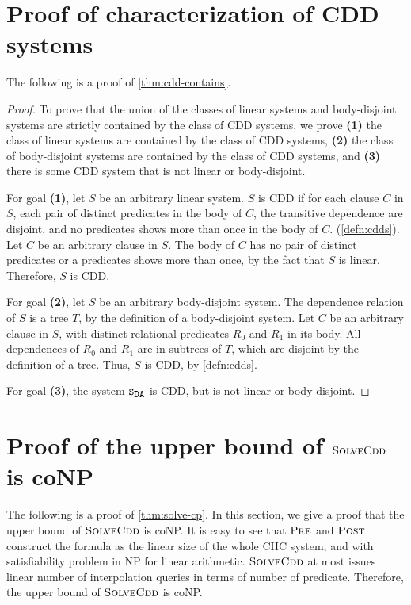 \section{Proof of characterization of CDD systems}
\label{app:char}
The following is a proof of \autoref{thm:cdd-contains}.
%
\begin{proof}
  To prove that the union of the classes of linear systems and
  body-disjoint systems are strictly contained by the class of CDD
  systems, we prove %
  \textbf{(1)} the class of linear systems are contained by the class
  of CDD systems, %
  \textbf{(2)} the class of body-disjoint systems are contained by the
  class of CDD systems, and %
  \textbf{(3)} there is some CDD system that is not linear or
  body-disjoint.

  For goal \textbf{(1)}, let $S$ be an arbitrary linear
  system.
  $S$ is CDD if for each clause $C$ in
  $S$, each pair of distinct predicates in
  the body of $C$, the transitive dependence are disjoint, and
  no predicates shows more than once in the body of $C$.
  (\autoref{defn:cdds}).
  Let $C$ be an arbitrary clause in $S$.
  The body of $C$ has no pair of distinct predicates or a predicates shows more than once, by the fact that
  $S$ is linear.
  Therefore, $S$ is CDD.

  For goal \textbf{(2)}, let $S$ be an arbitrary
  body-disjoint system.
  The dependence relation of $S$ is a tree $T$, by the
  definition of a body-disjoint system.
  Let $C$ be an arbitrary clause in $S$, with
  distinct relational predicates $R_0$ and $R_1$ in its body.
  All dependences of $R_0$ and $R_1$ are in subtrees of $T$, which
  are disjoint by the definition of a tree.
  Thus, $S$ is CDD, by \autoref{defn:cdds}.

  For goal \textbf{(3)}, the system $\mcchc$ is CDD, but is not linear
  or body-disjoint.
\end{proof}

\section{Proof of the upper bound of $\textsc{SolveCdd}$ is coNP}
\label{app:solve-cp}
The following is a proof of \autoref{thm:solve-cp}.
%
In this section, we give a proof that the upper bound of $\textsc{SolveCdd}$ is coNP.
%
It is easy to see that $\textsc{Pre}$ and $\textsc{Post}$ construct the formula as the linear size
of the whole CHC system, and with satisfiability problem in NP for linear arithmetic.
%
$\textsc{SolveCdd}$ at most issues linear number of interpolation queries in terms of number of predicate.
%
Therefore, the upper bound of $\textsc{SolveCdd}$ is coNP.

